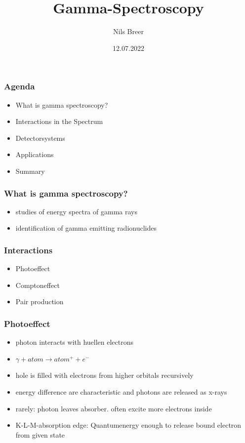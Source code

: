 \documentclass[aspectratio=1610, 9pt]{beamer}
\title{Gamma-Spectroscopy}
\author[N.Breer]{Nils Breer}
\institute{Fakultät Physik}
\date{12.07.2022}
\begin{document}
\maketitle

\begin{frame}\frametitle{Agenda}
  \begin{itemize}
    \item What is gamma spectroscopy?
    \item Interactions in the Spectrum
    \item Detectorsystems
    \item Applications
    \item Summary
  \end{itemize}
\end{frame}

\begin{frame}\frametitle{What is gamma spectroscopy?}
  \begin{itemize}
    \item studies of energy spectra of gamma rays
    \item identification of gamma emitting radionuclides
  \end{itemize}
\end{frame}

\begin{frame}\frametitle{Interactions}
  \begin{itemize}
    \item Photoeffect
    \item Comptoneffect
    \item Pair production
  \end{itemize}
\end{frame}

\begin{frame}\frametitle{Photoeffect}
  \begin{itemize}
    \item photon interacts with huellen electrons
    \item $\gamma + atom \to atom^{+} + e^{-}$
    \item hole is filled with electrons from higher orbitals recursively
    \item energy difference are characteristic and photons are released as x-rays
    \item rarely: photon leaves absorber. often excite more electrons inside
    \item K-L-M-absorption edge: Quantumenergy enough to release bound electron from given state
  \end{itemize}
\end{frame}
\end{document}
